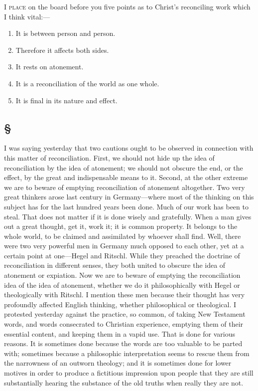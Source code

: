 \documentclass[draft]{ptfdoc}
\begin{document}









\textsc{I place} on the board before you five points 
as to Christ's reconciling work which I 
think vital:--- 

\begin{enumerate}
\item It is between person and person.
\item Therefore it affects both sides. 
\item It rests on atonement. 
\item It is a reconciliation of the world as 
one whole. 
\item It is final in its nature and effect.
\end{enumerate}

\subsection*{
\S
}

I was saying yesterday that two cautions 
ought to be observed in connection with this 
matter of reconciliation. First, we should not 
hide up the idea of reconciliation by the idea of 
atonement; we should not obscure the end, or 
the effect, by the great and indispensable means 
to it. Second, at the other extreme we are to 
beware of emptying reconciliation of atonement 
altogether. Two very great thinkers arose last 
century in Germany---where most of the thinking 
on this subject has for the last hundred years 
been done. Much of our work has been to steal. 
That does not matter if it is done wisely and 
gratefully. When a man gives out a great 
thought, get it, work it; it is common property. 
It belongs to the whole world, to be claimed and 
assimilated by whoever shall find. Well, there 
were two very powerful men in Germany much 
opposed to each other, yet at a certain point at 
one---Hegel and Ritschl. While they preached 
the doctrine of reconciliation in different senses, 
they both united to obscure the idea of atonement 
or expiation. Now we are to beware of 
emptying the reconciliation idea of the idea 
of atonement, whether we do it philosophically 
with Hegel or theologically with Ritschl. I 
mention these men because their thought has 
very profoundly affected English thinking, 
whether philosophical or theological. I protested 
yesterday against the practice, so common, 
of taking New Testament words, and 
words consecrated to Christian experience, 
emptying them of their essential content, and 
keeping them in a vapid use. That is done for 
various reasons. It is sometimes done because 
the words are too valuable to be parted with; 
sometimes because a philosophic interpretation 
seems to rescue them from the narrowness of 
an outworn theology; and it is sometimes done 
for lower motives in order to produce a fictitious 
impression upon people that they are still substantially 
hearing the substance of the old truths 
when really they are not. 
\end{document}
